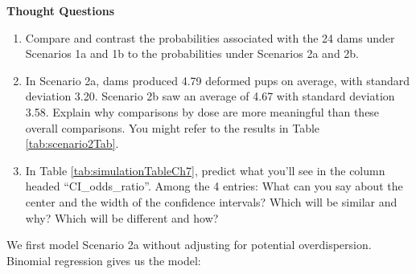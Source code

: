 \documentclass[
]{krantz}
\begin{document}
\begin{table}

\caption{\label{tab:scenario2Tab}Summary Statistics of Scenario 2 by Dose}
\centering
{}
\end{table}

\vspace{5mm}

\textbf{Thought Questions}

\begin{enumerate}
\def\labelenumi{\arabic{enumi}.}
\setcounter{enumi}{5}
\item
  Compare and contrast the probabilities associated with the 24 dams under Scenarios 1a and 1b to the probabilities under Scenarios 2a and 2b.
\item
  In Scenario 2a, dams produced 4.79 deformed pups on average, with standard deviation 3.20. Scenario 2b saw an average of 4.67 with standard deviation 3.58. Explain why comparisons by dose are more meaningful than these overall comparisons. You might refer to the results in Table \ref{tab:scenario2Tab}.
\item
  In Table \ref{tab:simulationTableCh7}, predict what you'll see in the column headed ``CI\_odds\_ratio''. Among the 4 entries: What can you say about the center and the width of the confidence intervals? Which will be similar and why? Which will be different and how?
\end{enumerate}

We first model Scenario 2a without adjusting for potential overdispersion. Binomial regression gives us the model:
\end{document}
